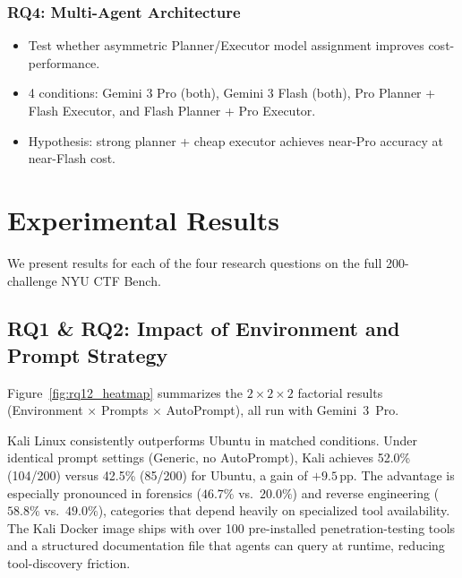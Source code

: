 \documentclass[conference]{IEEEtran}
\begin{document}
\subsubsection{RQ4: Multi-Agent Architecture}

\begin{itemize}
  \item Test whether asymmetric Planner/Executor model assignment improves cost-performance.
  \item 4 conditions: Gemini 3 Pro (both), Gemini 3 Flash (both), Pro Planner + Flash Executor, and Flash Planner + Pro Executor.
  \item Hypothesis: strong planner + cheap executor achieves near-Pro accuracy at near-Flash cost.
\end{itemize}

% 


\section{Experimental Results}

We present results for each of the four research questions on the full 200-challenge NYU CTF Bench.

\subsection{RQ1 \& RQ2: Impact of Environment and Prompt Strategy}

Figure~\ref{fig:rq12_heatmap} summarizes the $2\!\times\!2\!\times\!2$ factorial results (Environment $\times$ Prompts $\times$ AutoPrompt), all run with Gemini~3~Pro.

Kali Linux consistently outperforms Ubuntu in matched conditions. Under identical prompt settings (Generic, no AutoPrompt), Kali achieves 52.0\% (104/200) versus 42.5\% (85/200) for Ubuntu, a gain of $+9.5$\,pp. The advantage is especially pronounced in forensics ($46.7\%$ vs.\ $20.0\%$) and reverse engineering ($58.8\%$ vs.\ $49.0\%$), categories that depend heavily on specialized tool availability. The Kali Docker image ships with over 100 pre-installed penetration-testing tools and a structured documentation file that agents can query at runtime, reducing tool-discovery friction.
\end{document}
